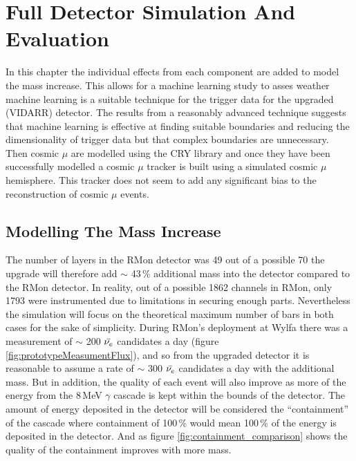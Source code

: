 
\chapter{Full Detector Simulation And Evaluation}\label{chp:DataAnalysisTechniques}

In this chapter the individual effects from each component are added to model the mass increase. This allows for a machine learning study to asses weather machine learning is a suitable technique for the trigger data for the upgraded (VIDARR) detector. The results from a reasonably advanced technique suggests that machine learning is effective at finding suitable boundaries and reducing the dimensionality of trigger data but that complex boundaries are unnecessary. Then cosmic $\mu$ are modelled using the CRY library \cite{ieee_cry_2007} and once they have been successfully modelled a cosmic $\mu$ tracker is built using a simulated cosmic $\mu$ hemisphere. This tracker does not seem to add any significant bias to the reconstruction of cosmic $\mu$ events.

\section{Modelling The Mass Increase}
The number of layers in the RMon detector was 49 out of a possible 70 the upgrade will therefore add $\sim$ 43\,\% additional mass into the detector compared to the RMon detector. In reality, out of a possible 1862 channels in RMon, only 1793 were instrumented due to limitations in securing enough parts. Nevertheless the simulation will focus on the theoretical maximum number of bars in both cases for the sake of simplicity. During RMon's deployment at Wylfa there was a measurement of $\sim$ 200 $\Bar{\nu_e}$ candidates a day \cite{Carroll_2018} (figure \ref{fig:prototypeMeasumentFlux}), and so from the upgraded detector it is reasonable to assume a rate of $\sim$ 300 $\Bar{\nu_e}$ candidates a day with the additional mass. But in addition, the quality of each event will also improve as more of the energy from the 8\,MeV $\gamma$ cascade is kept within the bounds of the detector. The amount of energy deposited in the detector will be considered the ``containment'' of the cascade where containment of 100\,\% would mean 100\,\% of the energy is deposited in the detector. And as figure \ref{fig:containment_comparison} shows the quality of the containment improves with more mass. %

